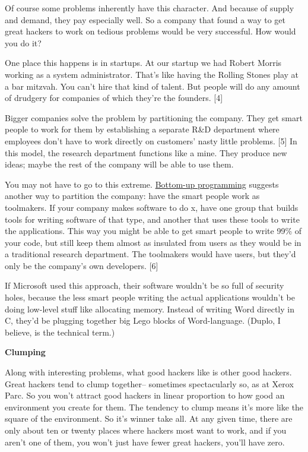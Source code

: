 Of course some problems inherently have this character. And because of
supply and demand, they pay especially well. So a company that found a
way to get great hackers to work on tedious problems would be very
successful. How would you do it?

One place this happens is in startups. At our startup we had Robert
Morris working as a system administrator. That's like having the Rolling
Stones play at a bar mitzvah. You can't hire that kind of talent. But
people will do any amount of drudgery for companies of which they're the
founders. {[}4{]}

Bigger companies solve the problem by partitioning the company. They get
smart people to work for them by establishing a separate R\&D department
where employees don't have to work directly on customers' nasty little
problems. {[}5{]} In this model, the research department functions like
a mine. They produce new ideas; maybe the rest of the company will be
able to use them.

You may not have to go to this extreme. \href{progbot.html}{Bottom-up
programming} suggests another way to partition the company: have the
smart people work as toolmakers. If your company makes software to do x,
have one group that builds tools for writing software of that type, and
another that uses these tools to write the applications. This way you
might be able to get smart people to write 99\% of your code, but still
keep them almost as insulated from users as they would be in a
traditional research department. The toolmakers would have users, but
they'd only be the company's own developers. {[}6{]}

If Microsoft used this approach, their software wouldn't be so full of
security holes, because the less smart people writing the actual
applications wouldn't be doing low-level stuff like allocating memory.
Instead of writing Word directly in C, they'd be plugging together big
Lego blocks of Word-language. (Duplo, I believe, is the technical term.)

\textbf{Clumping}

Along with interesting problems, what good hackers like is other good
hackers. Great hackers tend to clump together-- sometimes spectacularly
so, as at Xerox Parc. So you won't attract good hackers in linear
proportion to how good an environment you create for them. The tendency
to clump means it's more like the square of the environment. So it's
winner take all. At any given time, there are only about ten or twenty
places where hackers most want to work, and if you aren't one of them,
you won't just have fewer great hackers, you'll have zero.

